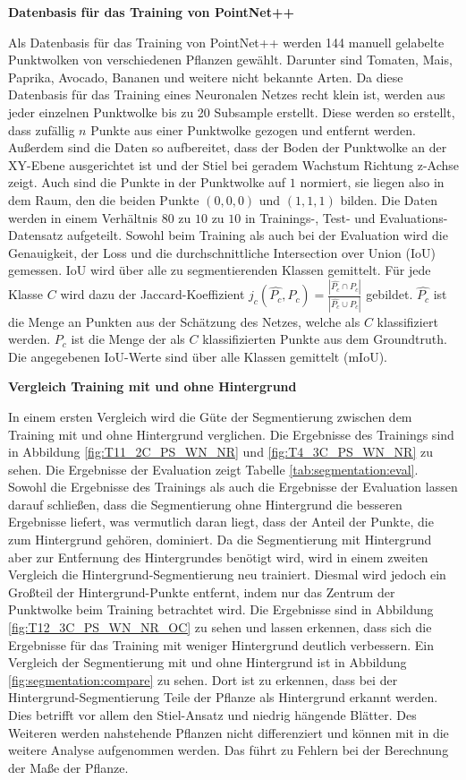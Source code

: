 \documentclass[12pt,titlepage, twoside]{article}
\begin{document}
\textbf{Datenbasis für das Training von PointNet++}

Als Datenbasis für das Training von PointNet++ werden 144 manuell gelabelte Punktwolken von verschiedenen Pflanzen gewählt. Darunter sind Tomaten, Mais, Paprika, Avocado, Bananen und weitere nicht bekannte Arten. 
Da diese Datenbasis für das Training eines Neuronalen Netzes recht klein ist, werden aus jeder einzelnen Punktwolke bis zu 20 Subsample erstellt. 
Diese werden so erstellt, dass zufällig $n$ Punkte aus einer Punktwolke gezogen und entfernt werden.
Außerdem sind die Daten so aufbereitet, dass der Boden der Punktwolke an der XY-Ebene ausgerichtet ist und der Stiel bei geradem Wachstum Richtung z-Achse zeigt. 
Auch sind die Punkte in der Punktwolke auf $1$ normiert, sie liegen also in dem Raum, den die beiden Punkte $(0,0,0)$ und $(1,1,1)$ bilden. 
Die Daten werden in einem Verhältnis $80$ zu $10$ zu $10$ in Trainings-, Test- und Evaluations-Datensatz aufgeteilt.
Sowohl beim Training als auch bei der Evaluation wird die Genauigkeit, der Loss und die durchschnittliche Intersection over Union (IoU) gemessen. IoU wird über alle zu segmentierenden Klassen gemittelt.
Für jede Klasse $C$ wird dazu der Jaccard-Koeffizient $j_c(\hat{P_c},P_c) = \frac{|\hat{P_c} \cap P_c|}{|\hat{P_c} \cup P_c|}$ gebildet. 
$\hat{P_c}$ ist die Menge an Punkten aus der Schätzung des Netzes, welche als $C$ klassifiziert werden. $P_c$ ist die Menge der als $C$ klassifizierten Punkte aus dem Groundtruth.
Die angegebenen IoU-Werte sind über alle Klassen gemittelt (mIoU).

\textbf{Vergleich Training mit und ohne Hintergrund}

In einem ersten Vergleich wird die Güte der Segmentierung zwischen dem Training mit und ohne Hintergrund verglichen. 
Die Ergebnisse des Trainings sind in Abbildung \ref{fig:T11_2C_PS_WN_NR} und \ref{fig:T4_3C_PS_WN_NR} zu sehen.
Die Ergebnisse der Evaluation zeigt Tabelle \ref{tab:segmentation:eval}. 
Sowohl die Ergebnisse des Trainings als auch die Ergebnisse der Evaluation lassen darauf schließen, dass die Segmentierung ohne Hintergrund die besseren Ergebnisse liefert, 
was vermutlich daran liegt, dass der Anteil der Punkte, die zum Hintergrund gehören, dominiert.
Da die Segmentierung mit Hintergrund aber zur Entfernung des Hintergrundes benötigt wird, wird in einem zweiten Vergleich die Hintergrund-Segmentierung neu trainiert. 
Diesmal wird jedoch ein Großteil der Hintergrund-Punkte entfernt, indem nur das Zentrum der Punktwolke beim Training betrachtet wird. 
Die Ergebnisse sind in Abbildung \ref{fig:T12_3C_PS_WN_NR_OC} zu sehen und lassen erkennen, dass sich die Ergebnisse für das Training mit weniger Hintergrund deutlich verbessern. 
Ein Vergleich der Segmentierung mit und ohne Hintergrund ist in Abbildung \ref{fig:segmentation:compare} zu sehen. 
Dort ist zu erkennen, dass bei der Hintergrund-Segmentierung Teile der Pflanze als Hintergrund erkannt werden. Dies betrifft vor allem den Stiel-Ansatz und niedrig hängende Blätter.
Des Weiteren werden nahstehende Pflanzen nicht differenziert und können mit in die weitere Analyse aufgenommen werden. Das führt zu Fehlern bei der Berechnung der Maße der Pflanze.
\end{document}
